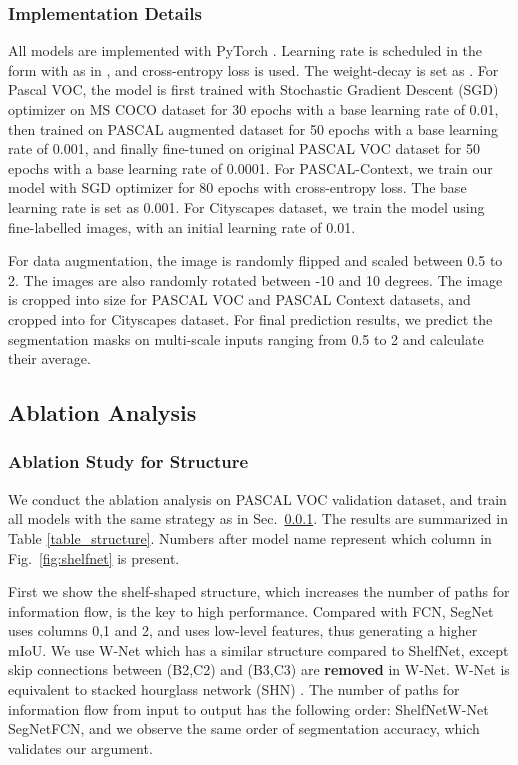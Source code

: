 \documentclass[10pt,twocolumn,letterpaper]{article}
\begin{document}
\subsubsection{Implementation Details}
\label{sec_implementation}
All models are implemented with PyTorch \cite{paszke2017automatic}. Learning rate is scheduled in the form  with  as in \cite{zhang2018context}, and cross-entropy loss is used. The weight-decay is set as .  For Pascal VOC, the model is first trained with Stochastic Gradient Descent (SGD) optimizer on MS COCO dataset for 30 epochs with a base learning rate of 0.01, then trained on PASCAL augmented dataset for 50 epochs with a base learning rate of 0.001, and finally fine-tuned on original PASCAL VOC dataset for 50 epochs with a base learning rate of 0.0001. For PASCAL-Context, we train our model with SGD optimizer for 80 epochs with cross-entropy loss. The base learning rate is set as 0.001. For Cityscapes dataset, we train the model using fine-labelled images, with an initial learning rate of 0.01. 

For data augmentation, the image is randomly flipped and scaled between 0.5 to 2. The images are also randomly rotated between -10 and 10 degrees. The image is cropped into size  for PASCAL VOC and PASCAL Context datasets, and cropped into  for Cityscapes dataset. For final prediction results, we predict the segmentation masks on multi-scale inputs ranging from 0.5 to 2 and calculate their average.
\subsection{Ablation Analysis}
\subsubsection{Ablation Study for Structure}
We conduct the ablation analysis on PASCAL VOC validation dataset, and train all models with the same strategy as in Sec.~\ref{sec_implementation}. The results are summarized in Table \ref{table_structure}. Numbers after model name represent which column in Fig.~\ref{fig:shelfnet} is present. 

First we show the shelf-shaped structure, which increases the number of paths for information flow, is the key to high performance. Compared with FCN, SegNet uses columns 0,1 and 2, and uses low-level features, thus generating a higher mIoU. We use W-Net which has a similar structure compared to ShelfNet, except skip connections between (B2,C2) and (B3,C3) are \textbf{removed} in W-Net. W-Net is equivalent to stacked hourglass network (SHN) \cite{newell2016stacked}. The number of paths for information flow from input to output has the following order: ShelfNetW-Net SegNetFCN, and we observe the same order of segmentation accuracy, which validates our argument.
\end{document}
